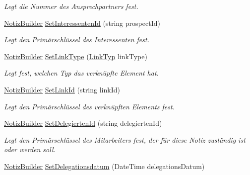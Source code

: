 \begin{DoxyCompactItemize}
\begin{DoxyCompactList}\small\item\em Legt die Nummer des Ansprechpartners fest. \end{DoxyCompactList}\item 
\hyperlink{class_products_1_1_model_1_1_builder_1_1_notiz_builder}{Notiz\+Builder} \hyperlink{class_products_1_1_model_1_1_builder_1_1_notiz_builder_a46e2f223e2ff252f66d73d0812366ed2}{Set\+Interessenten\+Id} (string prospect\+Id)
\begin{DoxyCompactList}\small\item\em Legt den Primärschlüssel des Interessenten fest. \end{DoxyCompactList}\item 
\hyperlink{class_products_1_1_model_1_1_builder_1_1_notiz_builder}{Notiz\+Builder} \hyperlink{class_products_1_1_model_1_1_builder_1_1_notiz_builder_a8cca409ce4ec40ee4286c4a53f733742}{Set\+Link\+Type} (\hyperlink{namespace_products_1_1_model_a0ea8a130b9a610541b442971b91cbc31}{Link\+Typ} link\+Type)
\begin{DoxyCompactList}\small\item\em Legt fest, welchen Typ das verknüpfte Element hat. \end{DoxyCompactList}\item 
\hyperlink{class_products_1_1_model_1_1_builder_1_1_notiz_builder}{Notiz\+Builder} \hyperlink{class_products_1_1_model_1_1_builder_1_1_notiz_builder_a8166254505dc5dab1e39ffeb2a5f409c}{Set\+Link\+Id} (string link\+Id)
\begin{DoxyCompactList}\small\item\em Legt den Primärschlüssel des verknüpften Elements fest. \end{DoxyCompactList}\item 
\hyperlink{class_products_1_1_model_1_1_builder_1_1_notiz_builder}{Notiz\+Builder} \hyperlink{class_products_1_1_model_1_1_builder_1_1_notiz_builder_a6c81a0226207523b8384172b15809783}{Set\+Delegierten\+Id} (string delegierten\+Id)
\begin{DoxyCompactList}\small\item\em Legt den Primärschlüssel des Mitarbeiters fest, der für diese Notiz zuständig ist oder werden soll. \end{DoxyCompactList}\item 
\hyperlink{class_products_1_1_model_1_1_builder_1_1_notiz_builder}{Notiz\+Builder} \hyperlink{class_products_1_1_model_1_1_builder_1_1_notiz_builder_a930680418f2208a40a9aeeb92e77dd73}{Set\+Delegationsdatum} (Date\+Time delegations\+Datum)

\end{DoxyCompactItemize}

